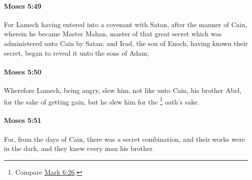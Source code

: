 		\paragraph{Moses 5:49} %
			\label{MOSES-5-49}

			For Lamech having entered into a covenant with Satan, after the manner of Cain, wherein he became Master Mahan, master of that great secret which was administered unto Cain by Satan; and Irad, the son of Enoch, having known their secret, began to reveal it unto the sons of Adam;


		\paragraph{Moses 5:50} %
			\label{MOSES-5-50}

			Wherefore Lamech, being angry, slew him, not like unto Cain, his brother Abel, for the sake of getting gain, but he slew him for the
				\footnote{%
					Compare \hyperref[MARK-6-26]{Mark 6:26}.
					}%
			oath's sake.


		\paragraph{Moses 5:51} %
			\label{MOSES-5-51}

			For, from the days of Cain, there was a secret combination, and their works were in the dark, and they knew every man his brother.


